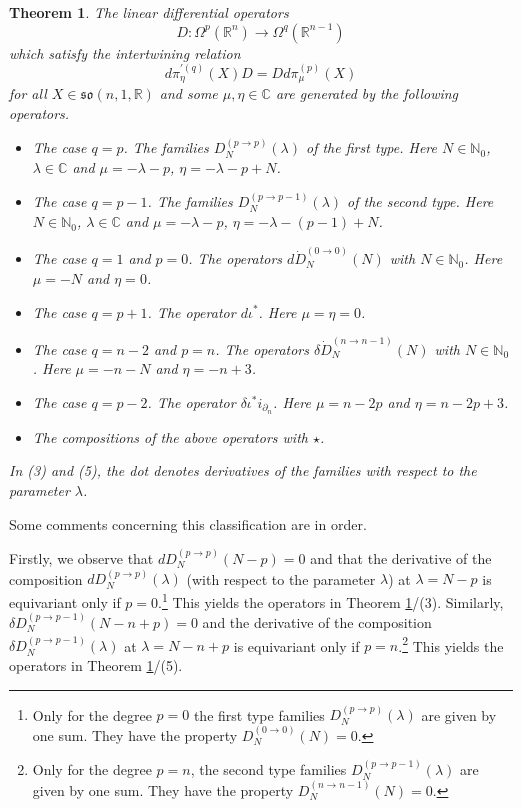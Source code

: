 \documentclass[a4paper,12pt,reqno]{amsart}
\newtheorem{thm}{Theorem}
\numberwithin{theorem}{subsection}
\numberwithin{equation}{section}
\begin{document}
\begin{thm}\label{classification} The linear differential operators
$$
   D: \Omega^p({\mathbb{R}}^n) \to \Omega^q({\mathbb{R}}^{n-1})
$$
which satisfy the intertwining relation
\begin{equation}\label{inter}
   {d}\pi^{\prime (q)}_\eta (X) D = D {d}\pi_\mu^{(p)}(X)
\end{equation}
for all $X \in \mathfrak{so}(n,1,{\mathbb{R}})$ and some $\mu, \eta \in {\mathbb{C}}$ are generated
by the following operators.
\begin{itemize}
\item [(1)] {The case $q=p$}. The families $D_N^{(p \to p)}(\lambda)$ of the first type. Here $N \in
{\mathbb{N}}_0$, $\lambda \in {\mathbb{C}}$ and $\mu=-\lambda-p$, $\eta = -\lambda-p+N$.
\item [(2)] {The case $q=p-1$}. The families $D_N^{(p \to p-1)}(\lambda)$ of the second type. Here $N \in
{\mathbb{N}}_0$, $\lambda \in {\mathbb{C}}$ and $\mu=-\lambda-p$, $\eta = -\lambda-(p-1)+N$.
\item [(3)] {The case $q=1$ and $p=0$}. The operators $d \dot{D}_N^{(0 \to
0)}(N)$ with $N \in {\mathbb{N}}_0$. Here $\mu=-N$ and $\eta=0$.
\item [(4)] {The case $q=p+1$}. The operator $d \iota^*$. Here $\mu=\eta=0$.
\item [(5)] {The case $q=n-2$ and $p=n$}. The operators $\delta \dot{D}_N^{(n \to
n-1)}(N)$ with $N \in {\mathbb{N}}_0$. Here $\mu=-n-N$ and $\eta=-n+3$.
\item [(6)] {The case $q=p-2$}. The operator $\delta \iota^* i_{\partial_n}$. Here $\mu=n-2p$ and $\eta=n-2p+3$.
\item [(7)] The compositions of the above operators with $\star$.
\end{itemize}
In (3) and (5), the dot denotes derivatives of the families with respect to the
parameter $\lambda$.
\end{thm}

Some comments concerning this classification are in order.

Firstly, we observe that $d D_N^{(p \to p)}(N-p) = 0$ and that the derivative
of the composition $d D_N^{(p \to p)}(\lambda)$ (with respect to the parameter
$\lambda$) at $\lambda = N-p$ is equivariant only if $p=0$.\footnote{Only for
the degree $p=0$ the first type families $D_N^{(p \to p)}(\lambda)$ are given
by one sum. They have the property $D_N^{(0 \to 0)}(N)=0$.} This yields the
operators in Theorem \ref{classification}/(3). Similarly, $\delta D_N^{(p \to
p-1)}(N-n+p) = 0$ and the derivative of the composition $\delta D_N^{(p \to
p-1)}(\lambda)$ at $\lambda = N-n+p$ is equivariant only if
$p=n$.\footnote{Only for the degree $p=n$, the second type families $D_N^{(p
\to p-1)}(\lambda)$ are given by one sum. They have the property $D_N^{(n \to
n-1)}(N) = 0$.} This yields the operators in Theorem \ref{classification}/(5).
\end{document}
